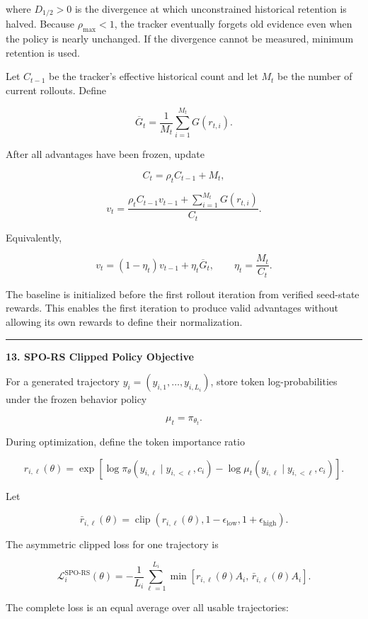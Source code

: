 \documentclass[
]{article}
\begin{document}
where \(D_{1/2}>0\) is the divergence at which unconstrained historical
retention is halved. Because \(\rho_{\max}<1\), the tracker eventually
forgets old evidence even when the policy is nearly unchanged. If the
divergence cannot be measured, minimum retention is used.

Let \(C_{t-1}\) be the tracker's effective historical count and let
\(M_t\) be the number of current rollouts. Define

\[
\overline G_t
=
\frac{1}{M_t}
\sum_{i=1}^{M_t}
G(r_{t,i}).
\]

After all advantages have been frozen, update

\[
C_t
=
\rho_t C_{t-1}+M_t,
\]

\[
v_t
=
\frac{
\rho_t C_{t-1}v_{t-1}
+
\sum_{i=1}^{M_t}G(r_{t,i})
}
{C_t}.
\]

Equivalently,

\[
v_t
=
(1-\eta_t)v_{t-1}
+
\eta_t\overline G_t,
\qquad
\eta_t=\frac{M_t}{C_t}.
\]

The baseline is initialized before the first rollout iteration from
verified seed-state rewards. This enables the first iteration to produce
valid advantages without allowing its own rewards to define their
normalization.

\begin{center}\rule{0.5\linewidth}{0.5pt}\end{center}

\textbf{13. SPO-RS Clipped Policy Objective}

For a generated trajectory \(y_i=(y_{i,1},\ldots,y_{i,L_i})\), store
token log-probabilities under the frozen behavior policy

\[
\mu_t=\pi_{\theta_t}.
\]

During optimization, define the token importance ratio

\[
r_{i,\ell}(\theta)
=
\exp\left[
\log\pi_\theta(y_{i,\ell}\mid y_{i,<\ell},c_i)
-
\log\mu_t(y_{i,\ell}\mid y_{i,<\ell},c_i)
\right].
\]

Let

\[
\bar r_{i,\ell}(\theta)
=
\operatorname{clip}
\left(
r_{i,\ell}(\theta),
1-\epsilon_{\mathrm{low}},
1+\epsilon_{\mathrm{high}}
\right).
\]

The asymmetric clipped loss for one trajectory is

\[
\mathcal L_i^{\mathrm{SPO\text{-}RS}}(\theta)
=
-\frac{1}{L_i}
\sum_{\ell=1}^{L_i}
\min\left[
r_{i,\ell}(\theta)A_i,\,
\bar r_{i,\ell}(\theta)A_i
\right].
\]

The complete loss is an equal average over all usable trajectories:
\end{document}
